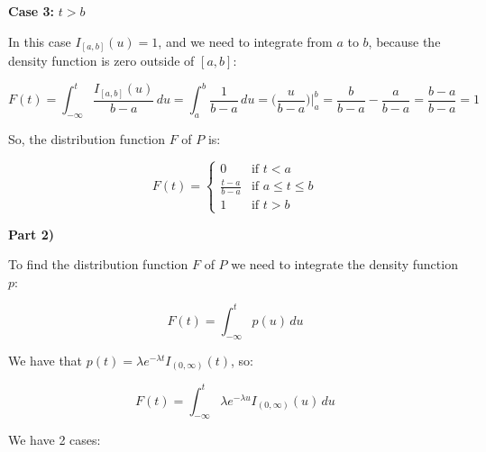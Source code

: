 \singlespacing

\textbf{Case 3:} $t > b$

\singlespacing

In this case $I_{[a,b]}(u) = 1$, and we need to integrate from $a$ to $b$,
because the density function is zero outside of $[a, b]$:

\singlespacing

\begin{equation}
    F(t) = \int_{-\infty}^{t} \frac{I_{[a,b]}(u)}{b-a} \, du = \int_{a}^{b} \frac{1}{b-a} \, du = \Big(\frac{u}{b-a} \Big)\Big|_{a}^{b} = \frac{b}{b-a} - \frac{a}{b-a} = \frac{b - a}{b-a} = 1
\end{equation}

\singlespacing

So, the distribution function $F$ of $P$ is:

\singlespacing

\begin{equation}
    F(t) = \begin{cases}
        0                 & \text{if } t < a           \\
        \frac{t - a}{b-a} & \text{if } a \leq t \leq b \\
        1                 & \text{if } t > b
    \end{cases}
\end{equation}

\singlespacing

\textbf{Part 2)}

\singlespacing

To find the distribution function $F$ of $P$ we need to integrate the density function $p$:

\singlespacing

\begin{equation}
    F(t) = \int_{-\infty}^{t} p(u) \, du
\end{equation}

\singlespacing

We have that $p(t) = \lambda e^{-\lambda t}I_{(0,\infty)}(t)$, so:

\singlespacing

\begin{equation}
    F(t) = \int_{-\infty}^{t} \lambda e^{-\lambda u}I_{(0,\infty)}(u) \, du
\end{equation}

\singlespacing

We have 2 cases:

\singlespacing

